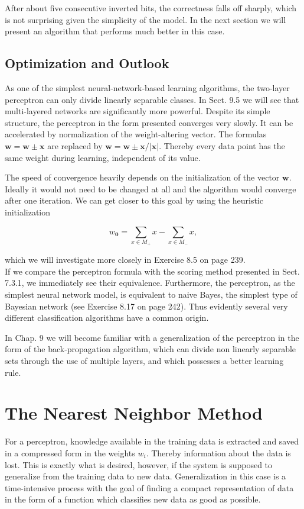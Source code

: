 \documentclass[10pt]{book}
\begin{document}
After about five consecutive inverted bits, the correctness falls off sharply, which is not surprising given the simplicity of the model. In the next section we will present an algorithm that performs much better in this case.

\subsection{Optimization and Outlook}
As one of the simplest neural-network-based learning algorithms, the two-layer perceptron can only divide linearly separable classes. In Sect. 9.5 we will see that multi-layered networks are significantly more powerful. Despite its simple\\
structure, the perceptron in the form presented converges very slowly. It can be accelerated by normalization of the weight-altering vector. The formulas $\boldsymbol{w}=\boldsymbol{w} \pm \boldsymbol{x}$ are replaced by $\boldsymbol{w}=\boldsymbol{w} \pm \boldsymbol{x} /|\boldsymbol{x}|$. Thereby every data point has the same weight during learning, independent of its value.

The speed of convergence heavily depends on the initialization of the vector $\boldsymbol{w}$. Ideally it would not need to be changed at all and the algorithm would converge after one iteration. We can get closer to this goal by using the heuristic initialization

$$
w_{\mathbf{0}}=\sum_{x \in M_{+}} x-\sum_{x \in M_{-}} x,
$$

which we will investigate more closely in Exercise 8.5 on page 239.\\
If we compare the perceptron formula with the scoring method presented in Sect. 7.3.1, we immediately see their equivalence. Furthermore, the perceptron, as the simplest neural network model, is equivalent to naive Bayes, the simplest type of Bayesian network (see Exercise 8.17 on page 242). Thus evidently several very different classification algorithms have a common origin.

In Chap. 9 we will become familiar with a generalization of the perceptron in the form of the back-propagation algorithm, which can divide non linearly separable sets through the use of multiple layers, and which possesses a better learning rule.

\section{The Nearest Neighbor Method}
For a perceptron, knowledge available in the training data is extracted and saved in a compressed form in the weights $w_{i}$. Thereby information about the data is lost. This is exactly what is desired, however, if the system is supposed to generalize from the training data to new data. Generalization in this case is a time-intensive process with the goal of finding a compact representation of data in the form of a function which classifies new data as good as possible.
\end{document}
